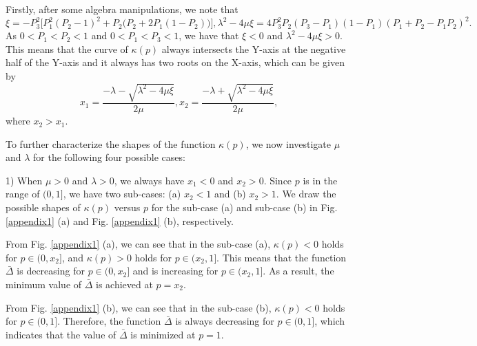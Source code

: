 \documentclass{IEEEtran}
\begin{document}
\begin{appendices}
Firstly, after some algebra manipulations, we note that
\begin{subequations}
	\begin{equation}
	\xi=-P_{3}^2\Big[P_{1}^2(P_{2}-1)^2+P_{2}\big(P_{2}+2P_{1}(1-P_{2})\big)\Big],
	\end{equation}
	\begin{equation}
	\lambda^2-4\mu \xi=4P_{3}^2P_{2}(P_{3}-P_{1})(1-P_{1})(P_{1}+P_{2}-P_{1}P_{2})^2.
	\end{equation}
\end{subequations}
As $0<P_{1}<P_{2}<1$ and $0<P_{1}<P_{3}<1$, we have that $\xi<0$ and $\lambda^2-4\mu \xi>0$. This means that the curve of $\kappa(p)$ always intersects the Y-axis at the negative half of the Y-axis and it always has two roots on the X-axis, which can be given by
\begin{subequations}
	\begin{equation}
	x_{1}=\frac{-\lambda -\sqrt{\lambda ^2-4\mu  \xi}}{2\mu},
	\end{equation}
	\begin{equation}\label{proof3x2}
	x_{2}=\frac{-\lambda +\sqrt{\lambda ^2-4\mu  \xi}}{2\mu},
	\end{equation}
\end{subequations}
where $x_{2}>x_{1}$. 

To further characterize the shapes of the function $\kappa(p)$, we now investigate $\mu$ and $\lambda$ for the following four possible cases:

1) When $\mu>0$ and $\lambda>0$, we always have $x_{1}<0$ and $x_{2}>0$. Since $p$ is in the range of $(0, 1]$, we have two sub-cases: (a) $x_{2}<1$ and (b) $x_{2}>1$. We draw the possible shapes of $\kappa(p)$ versus $p$ for the sub-case (a) and sub-case (b) in Fig. \ref{appendix1} (a) and Fig. \ref{appendix1} (b), respectively.


From Fig. \ref{appendix1} (a), we can see that in the sub-case (a), $\kappa(p)<0$ holds for $p\in(0, x_{2}]$, and $\kappa(p)>0$ holds for $p\in(x_{2}, 1]$. This means that the function $\bar\Delta$ is decreasing for $p\in(0, x_{2}]$ and is increasing for $p\in(x_{2}, 1]$. As a result, the minimum value of $\bar\Delta$ is achieved at $p=x_{2}$.

From Fig. \ref{appendix1} (b), we can see that in the sub-case (b), $\kappa(p)<0$ holds for $p\in(0, 1]$. Therefore, the function $\bar\Delta$ is always decreasing for $p\in(0, 1]$, which indicates that the value of $\bar\Delta$ is minimized at $p=1$.


\end{appendices}
\end{document}
